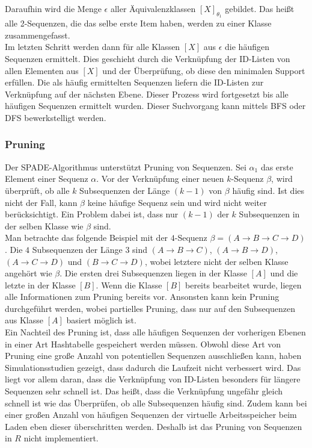 \noindent Daraufhin wird die Menge $\epsilon$ aller Äquivalenzklassen $[X]_{\theta_1}$ gebildet. Das heißt alle 2-Sequenzen, die das selbe erste Item haben, werden zu einer Klasse zusammengefasst.\\
Im letzten Schritt werden dann für alle Klassen $[X]$ aus $\epsilon$ die häufigen Sequenzen ermittelt. Dies geschieht durch die Verknüpfung der ID-Listen von allen Elementen aus $[X]$ und der Überprüfung, ob diese den minimalen Support erfüllen. Die als häufig ermittelten Sequenzen liefern die ID-Listen zur Verknüpfung auf der nächsten Ebene. Dieser Prozess wird fortgesetzt bis alle häufigen Sequenzen ermittelt wurden. Dieser Suchvorgang kann mittels BFS oder DFS bewerkstelligt werden.\\

\subsubsection*{Pruning}
Der SPADE-Algorithmus unterstützt Pruning von Sequenzen. Sei $\alpha_1$ das erste Element einer Sequenz $\alpha$. Vor der Verknüpfung einer neuen $k$-Sequenz $\beta$, wird überprüft, ob alle $k$ Subsequenzen der Länge $(k-1)$ von $\beta$ häufig sind. Ist dies nicht der Fall, kann $\beta$ keine häufige Sequenz sein und wird nicht weiter berücksichtigt. Ein Problem dabei ist, dass nur $(k-1)$ der $k$ Subsequenzen in der selben Klasse wie $\beta$ sind.\\
Man betrachte das folgende Beispiel mit der $4$-Sequenz $\beta = (A\rightarrow B\rightarrow C\rightarrow D)$. Die $4$ Subsequenzen der Länge $3$ sind $(A\rightarrow B\rightarrow C)$, $(A\rightarrow B\rightarrow D)$, $(A\rightarrow C\rightarrow D)$ und $(B\rightarrow C\rightarrow D)$, wobei letztere nicht der selben Klasse angehört wie $\beta$. Die ersten drei Subsequenzen liegen in der Klasse $[A]$ und die letzte in der Klasse $[B]$. Wenn die Klasse $[B]$ bereits bearbeitet wurde, liegen alle Informationen zum Pruning bereits vor. Ansonsten kann kein Pruning durchgeführt werden, wobei partielles Pruning, dass nur auf den Subsequenzen aus Klasse $[A]$ basiert möglich ist.\\
Ein Nachteil des Pruning ist, dass alle häufigen Sequenzen der vorherigen Ebenen in einer Art Hashtabelle gespeichert werden müssen. Obwohl diese Art von Pruning eine große Anzahl von potentiellen Sequenzen ausschließen kann, haben Simulationsstudien \cite{spade} gezeigt, dass dadurch die Laufzeit nicht verbessert wird. Das liegt vor allem daran, dass die Verknüpfung von ID-Listen besonders für längere Sequenzen sehr schnell ist. Das heißt, dass die Verknüpfung ungefähr gleich schnell ist wie das Überprüfen, ob alle Subsequenzen häufig sind. Zudem kann bei einer großen Anzahl von häufigen Sequenzen der virtuelle Arbeitsspeicher beim Laden eben dieser überschritten werden. Deshalb ist das Pruning von Sequenzen in $R$ nicht implementiert.